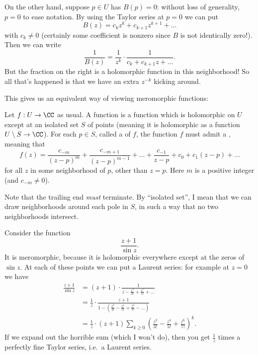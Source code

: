 On the other hand, suppose $p \in U$ has $B(p) = 0$: without loss of generality, $p=0$
to ease notation.
By using the Taylor series at $p=0$ we can put
\[ B(z) = c_kz^k + c_{k+1}z^{k+1} + \dots \]
with $c_k \neq 0$
(certainly some coefficient is nonzero since $B$ is not identically zero!).
Then we can write
\[ \frac{1}{B(z)} = \frac{1}{z^k} \cdot \frac{1}{c_k + c_{k+1}z + \dots}. \]
But the fraction on the right is a holomorphic function in this neighborhood!
So all that's happened is that we have an extra $z^{-k}$ kicking around.




This gives us an equivalent way of viewing meromorphic functions:

\begin{definition}
	Let $f : U \to \CC$ as usual.
	A  function is a function which is holomorphic on $U$
	except at an isolated set $S$ of points (meaning it is holomorphic as a function $U \setminus S \to \CC$).
	For each $p \in S$, called a  of $f$, the function $f$ must admit a ,
	meaning that
	\[
		f(z) =
		\frac{c_{-m}}{(z-p)^m}
		+ \frac{c_{-m+1}}{(z-p)^{m-1}}
		+ \dots
		+ \frac{c_{-1}}{z-p} + c_0 + c_1 (z-p) + \dots
	\]
	for all $z$ in some neighborhood of $p$, other than $z = p$.
	Here $m$ is a positive integer (and $c_{-m} \neq 0$).
\end{definition}
Note that the trailing end \emph{must} terminate.
By ``isolated set'', I mean that we can draw neighborhoods around each pole in $S$,
in such a way that no two neighborhoods intersect.

\begin{example}
	Consider the function \[ \frac{z+1}{\sin z}. \]
	It is meromorphic, because it is holomorphic everywhere except at the zeros of $\sin z$.
	At each of these points we can put a Laurent series: for example at $z=0$ we have
	\begin{align*}
		\frac{z+1}{\sin z}
		&= (z+1) \cdot \frac{1}{z - \frac{z^3}{3!} + \frac{z^5}{5!} + \dots} \\
		&= \frac 1z \cdot \frac{z+1}{1 - \left( \frac{z^2}{3!} - \frac{z^4}{5!} + \frac{z^6}{7!} - \dots \right)} \\
		&= \frac 1z \cdot (z+1) \sum_{k \ge 0} \left( \frac{z^2}{3!}-\frac{z^4}{5!}+\frac{z^6}{7!} \right)^k.
	\end{align*}
	If we expand out the horrible sum (which I won't do), then you get $\frac 1z$ times a perfectly
	fine Taylor series, i.e.\ a Laurent series.
\end{example}

